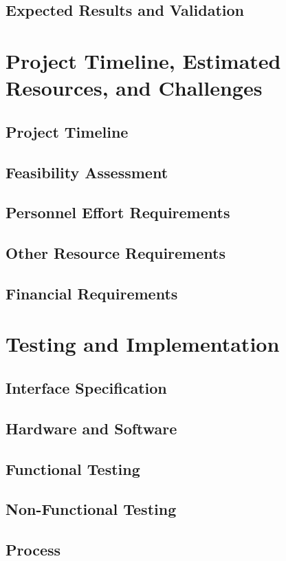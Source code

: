 \documentclass[11pt]{article}
\begin{document}
\subsection{Expected Results and Validation}




\section{Project Timeline, Estimated Resources, and Challenges}
\subsection{Project Timeline}
\subsection{Feasibility Assessment}
\subsection{Personnel Effort Requirements}
\subsection{Other Resource Requirements}
\subsection{Financial Requirements}




\section{Testing and Implementation}
\subsection{Interface Specification}
\subsection{Hardware and Software}
\subsection{Functional Testing}
\subsection{Non-Functional Testing}
\subsection{Process}
\end{document}
